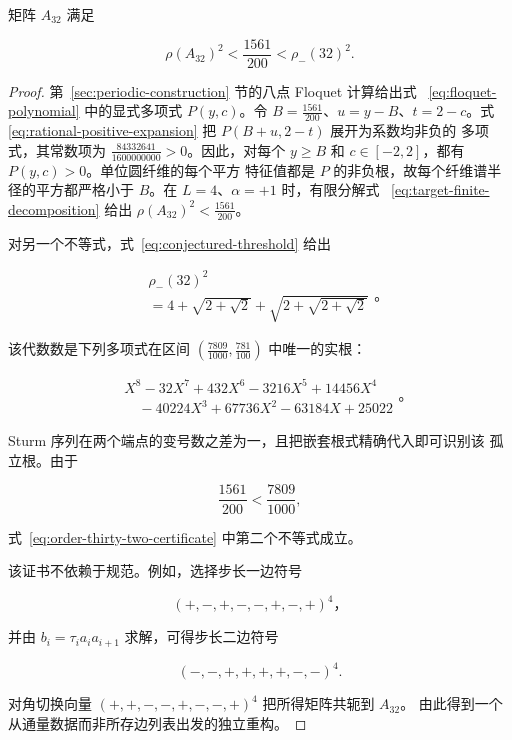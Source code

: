 \begin{proposition}
\label{prop:order-thirty-two-witness}
矩阵 \(A_{32}\) 满足

\begin{equation}
\label{eq:order-thirty-two-certificate}
\rho(A_{32})^{2} < \frac{1561}{200} < \rho_-(32)^{2}.
\end{equation}

\end{proposition}
\begin{proof}
第~\ref{sec:periodic-construction} 节的八点 Floquet 计算给出式~
\eqref{eq:floquet-polynomial} 中的显式多项式 \(P(y,c)\)。令
\(B=\frac{1561}{200}\)、\(u=y-B\)、\(t=2-c\)。式~
\eqref{eq:rational-positive-expansion} 把 \(P(B+u,2-t)\) 展开为系数均非负的
多项式，其常数项为 \(\frac{84332641}{1600000000}>0\)。因此，对每个
\(y\geq B\) 和 \(c\in[-2,2]\)，都有 \(P(y,c)>0\)。单位圆纤维的每个平方
特征值都是 \(P\) 的非负根，故每个纤维谱半径的平方都严格小于 \(B\)。在
\(L=4\)、\(\alpha=+1\) 时，有限分解式~
\eqref{eq:target-finite-decomposition} 给出
\(\rho(A_{32})^2<\frac{1561}{200}\)。

对另一个不等式，式~\eqref{eq:conjectured-threshold} 给出

\begin{equation}
\label{eq:order-thirty-two-threshold}
\begin{aligned}
&\rho_-(32)^{2} \\
&=4+\sqrt{2+\sqrt{2}}+\sqrt{2+\sqrt{2+\sqrt{2}}}
\end{aligned}
\text{。}
\end{equation}

该代数数是下列多项式在区间
\((\frac{7809}{1000},\frac{781}{100})\) 中唯一的实根：

\begin{equation}
\label{eq:order-thirty-two-polynomial}
\begin{aligned}
&X^{8}-32X^{7}+432X^{6}-3216X^{5}+14456X^{4} \\
&\quad -40224X^{3}+67736X^{2}-63184X+25022
\end{aligned}
\text{。}
\end{equation}

Sturm 序列在两个端点的变号数之差为一，且把嵌套根式精确代入即可识别该
孤立根。由于

\begin{equation}
\frac{1561}{200} < \frac{7809}{1000},
\end{equation}

式~\eqref{eq:order-thirty-two-certificate} 中第二个不等式成立。

该证书不依赖于规范。例如，选择步长一边符号

\begin{equation}
(+,-,+,-,-,+,-,+)^{4}\text{，}
\end{equation}

并由 \(b_i=\tau_i a_i a_{i+1}\) 求解，可得步长二边符号

\begin{equation}
(-,-,+,+,+,+,-,-)^{4}.
\end{equation}

对角切换向量 \((+,+,-,-,+,-,-,+)^4\) 把所得矩阵共轭到 \(A_{32}\)。
由此得到一个从通量数据而非所存边列表出发的独立重构。

\end{proof}
